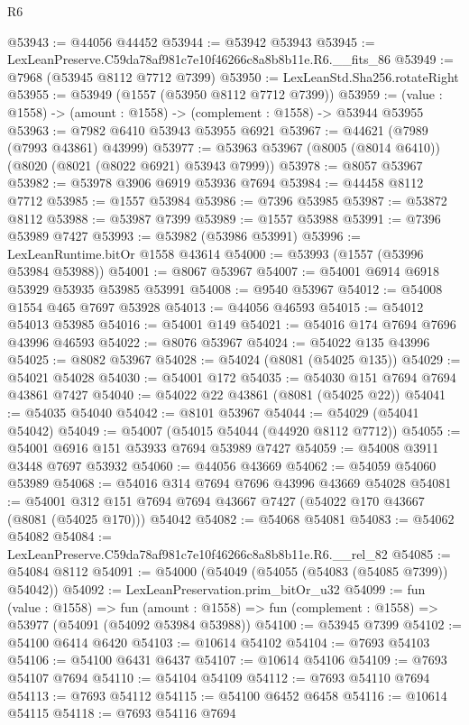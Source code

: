 \begin{lexlean}{R6}
\begin{coremodule}
@53943 := @44056 @44452
@53944 := @53942 @53943
@53945 := LexLeanPreserve.C59da78af981c7e10f46266c8a8b8b11e.R6.__fits_86
@53949 := @7968 (@53945 @8112 @7712 @7399)
@53950 := LexLeanStd.Sha256.rotateRight
@53955 := @53949 (@1557 (@53950 @8112 @7712 @7399))
@53959 := (value : @1558) -> (amount : @1558) -> (complement : @1558) -> @53944 @53955
@53963 := @7982 @6410 @53943 @53955 @6921
@53967 := @44621 (@7989 (@7993 @43861) @43999)
@53977 := @53963 @53967 (@8005 (@8014 @6410)) (@8020 (@8021 (@8022 @6921) @53943 @7999))
@53978 := @8057 @53967
@53982 := @53978 @3906 @6919 @53936 @7694
@53984 := @44458 @8112 @7712
@53985 := @1557 @53984
@53986 := @7396 @53985
@53987 := @53872 @8112
@53988 := @53987 @7399
@53989 := @1557 @53988
@53991 := @7396 @53989 @7427
@53993 := @53982 (@53986 @53991)
@53996 := LexLeanRuntime.bitOr @1558 @43614
@54000 := @53993 (@1557 (@53996 @53984 @53988))
@54001 := @8067 @53967
@54007 := @54001 @6914 @6918 @53929 @53935 @53985 @53991
@54008 := @9540 @53967
@54012 := @54008 @1554 @465 @7697 @53928
@54013 := @44056 @46593
@54015 := @54012 @54013 @53985
@54016 := @54001 @149
@54021 := @54016 @174 @7694 @7696 @43996 @46593
@54022 := @8076 @53967
@54024 := @54022 @135 @43996
@54025 := @8082 @53967
@54028 := @54024 (@8081 (@54025 @135))
@54029 := @54021 @54028
@54030 := @54001 @172
@54035 := @54030 @151 @7694 @7694 @43861 @7427
@54040 := @54022 @22 @43861 (@8081 (@54025 @22))
@54041 := @54035 @54040
@54042 := @8101 @53967
@54044 := @54029 (@54041 @54042)
@54049 := @54007 (@54015 @54044 (@44920 @8112 @7712))
@54055 := @54001 @6916 @151 @53933 @7694 @53989 @7427
@54059 := @54008 @3911 @3448 @7697 @53932
@54060 := @44056 @43669
@54062 := @54059 @54060 @53989
@54068 := @54016 @314 @7694 @7696 @43996 @43669 @54028
@54081 := @54001
    @312
    @151
    @7694
    @7694
    @43667
    @7427
    (@54022 @170 @43667 (@8081 (@54025 @170)))
    @54042
@54082 := @54068 @54081
@54083 := @54062 @54082
@54084 := LexLeanPreserve.C59da78af981c7e10f46266c8a8b8b11e.R6.__rel_82
@54085 := @54084 @8112
@54091 := @54000 (@54049 (@54055 (@54083 (@54085 @7399)) @54042))
@54092 := LexLeanPreservation.prim_bitOr_u32
@54099 := fun (value : @1558) =>
  fun (amount : @1558) => fun (complement : @1558) => @53977 (@54091 (@54092 @53984 @53988))
@54100 := @53945 @7399
@54102 := @54100 @6414 @6420
@54103 := @10614 @54102
@54104 := @7693 @54103
@54106 := @54100 @6431 @6437
@54107 := @10614 @54106
@54109 := @7693 @54107 @7694
@54110 := @54104 @54109
@54112 := @7693 @54110 @7694
@54113 := @7693 @54112
@54115 := @54100 @6452 @6458
@54116 := @10614 @54115
@54118 := @7693 @54116 @7694

\end{coremodule}
\end{lexlean}
